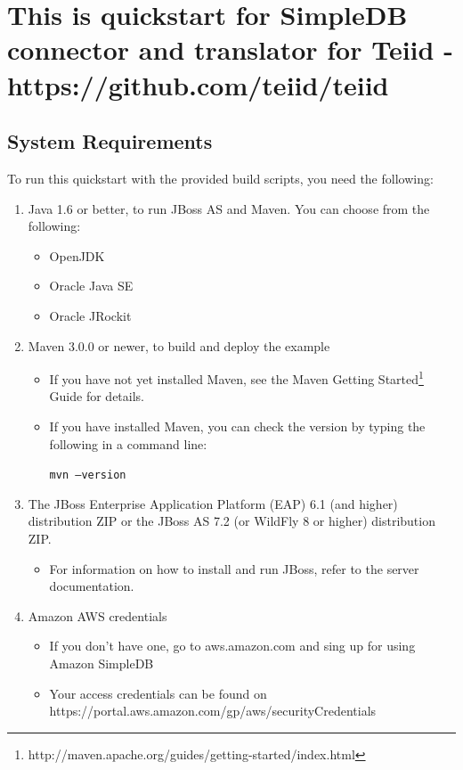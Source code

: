 \documentclass[oneside,12pt]{fithesis2}
\begin{document}
\section*{This is quickstart for SimpleDB connector and translator for Teiid - https://github.com/teiid/teiid}
\subsection*{System Requirements}
To run this quickstart with the provided build scripts, you need the following:
\begin{enumerate}
 \item Java 1.6 or better, to run JBoss AS and Maven. You can choose from the following:
 \begin{itemize}
  \item OpenJDK
  \item Oracle Java SE
  \item Oracle JRockit
 \end{itemize}

 \item Maven 3.0.0 or newer, to build and deploy the example
 \begin{itemize}
  \item If you have not yet installed Maven, see the Maven Getting Started\footnote{http://maven.apache.org/guides/getting-started/index.html} Guide for details.
  \item If you have installed Maven, you can check the version by typing the following in a command line:

  \texttt{mvn --version}
 \end{itemize}
 
 \item The JBoss Enterprise Application Platform (EAP) 6.1 (and higher) distribution ZIP or the JBoss AS 7.2 (or WildFly 8 or higher) distribution ZIP.
 \begin{itemize}
  \item For information on how to install and run JBoss, refer to the server documentation.
 \end{itemize}

 \item Amazon AWS credentials
 \begin{itemize}
  \item If you don't have one, go to aws.amazon.com and sing up for using Amazon SimpleDB
  \item Your access credentials can be found on https://portal.aws\allowbreak .amazon.com/gp/aws/securityCredentials
 \end{itemize}


\end{enumerate}
\end{document}
